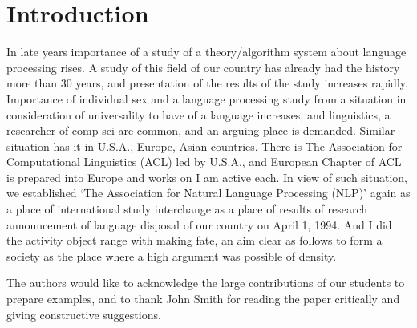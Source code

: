\documentclass[english,tombow]{jnlp_3.3}
\begin{document}
\maketitle

\section{Introduction}

In late years importance of a study of a theory/algorithm system 
about language processing rises\cite{Article_01}. 
A study of this field of our country has already had the history 
more than 30 years, 
and presentation of the results of the study increases rapidly. 
Importance of individual sex and a language processing study from a situation 
in consideration of universality to have of a language increases, 
and linguistics, a researcher of comp-sci are common, 
and an arguing place is demanded\cite{Book_02}. 
Similar situation has it in U.S.A., Europe, Asian countries. 
There is The Association for Computational Linguistics (ACL) led by U.S.A., 
and European Chapter of ACL is prepared into Europe and works on I am active each. 
In view of such situation\cite{Inproc_03}, 
we established `The Association for Natural Language Processing (NLP)' 
again as a place of international study interchange as 
a place of results of research announcement of language disposal of 
our country on April 1, 1994\cite{Masters_04,Techrep_05}. 
And I did the activity object range with making fate, 
an aim clear as follows to form a society as the place 
where a high argument was possible of density\nocite{Web_06}.


\acknowledgment

The authors would like to acknowledge the large contributions of our
students to prepare examples, and to thank John Smith for reading the
paper critically and giving constructive suggestions.




\begin{biography}


\end{biography}

\end{document}
